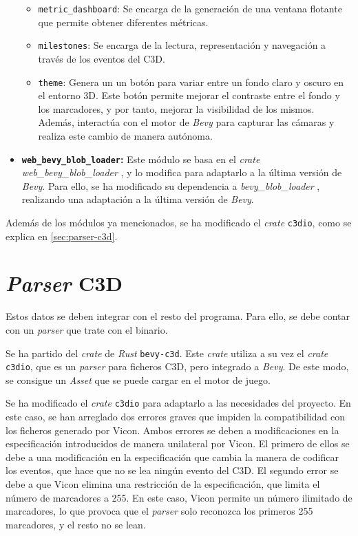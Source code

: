 \begin{itemize}
    \begin{itemize}
        \item \texttt{metric\_dashboard}: Se encarga de la generación de una ventana flotante que permite obtener diferentes métricas.
        \item \texttt{milestones}: Se encarga de la lectura, representación y navegación a través de los eventos del \ac{C3D}.
        \item \texttt{theme}: Genera un un botón para variar entre un fondo claro y oscuro en el entorno 3D. Este botón permite mejorar el contraste entre el fondo y los marcadores, y por tanto, mejorar la visibilidad de los mismos. Además, interactúa con el motor de \textit{Bevy} para capturar las cámaras y realiza este cambio de manera autónoma.
    \end{itemize}
    \item \textbf{\texttt{web\_bevy\_blob\_loader}:} Este módulo se basa en el \textit{crate} \textit{web\_bevy\_blob\_loader} \autocite{kayhKayhhhBevy_web_file_drop2024}, y lo modifica para adaptarlo a la última versión de \textit{Bevy}. Para ello, se ha modificado su dependencia a \textit{bevy\_blob\_loader} \autocite{kayhKayhhhBevy_blob_loader2024}, realizando una adaptación a la última versión de \textit{Bevy}.
\end{itemize}

Además de los módulos ya mencionados, se ha modificado el \textit{crate} \texttt{c3dio}, como se explica en \autoref{sec:parser-c3d}.

\section{\textit{Parser} \acs{C3D}} \label{sec:parser-c3d}
Estos datos se deben integrar con el resto del programa. Para ello, se debe contar con un \textit{parser} que trate con el binario.

Se ha partido del \textit{crate} de \textit{Rust} \texttt{bevy-c3d}. Este \textit{crate} utiliza a su vez el \textit{crate} \texttt{c3dio}, que es un \textit{parser} para ficheros \ac{C3D}, pero integrado a \textit{Bevy}. De este modo, se consigue un \textit{Asset} que se puede cargar en el motor de juego.

Se ha modificado el \textit{crate} \texttt{c3dio} para adaptarlo a las necesidades del proyecto. En este caso, se han arreglado dos errores graves que impiden la compatibilidad con los ficheros generado por Vicon. Ambos errores se deben a modificaciones en la especificación introducidos de manera unilateral por Vicon. El primero de ellos se debe a una modificación en la especificación que cambia la manera de codificar los eventos, que hace que no se lea ningún evento del \ac{C3D}. El segundo error se debe a que Vicon elimina una restricción de la especificación, que limita el número de marcadores a 255. En este caso, Vicon permite un número ilimitado de marcadores, lo que provoca que el \textit{parser} solo reconozca los primeros 255 marcadores, y el resto no se lean.   

